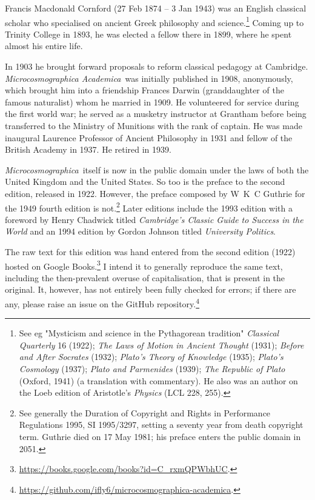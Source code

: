 \documentclass[12pt, oneside, b5paper]{memoir}
\newcommand{\ma}{\textit{Microcosmographica Academica}\ }
\newcommand{\mashort}{\textit{Microcosmographica}\ }
\begin{document}
Francis Macdonald Cornford (27 Feb 1874 -- 3 Jan 1943) was an English classical scholar who specialised on ancient Greek philosophy and science.\footnote{See eg "Mysticism and science in the Pythagorean tradition" \emph{Classical Quarterly} 16 (1922); \emph{The Laws of Motion in Ancient Thought} (1931); \emph{Before and After Socrates} (1932); \emph{Plato's Theory of Knowledge} (1935); \emph{Plato's Cosmology} (1937); \emph{Plato and Parmenides} (1939); \emph{The Republic of Plato} (Oxford, 1941) (a translation with commentary). He also was an author on the Loeb edition of Aristotle's \emph{Physics} (LCL 228, 255).} Coming up to Trinity College in 1893, he was elected a fellow there in 1899, where he spent almost his entire life.

In 1903 he brought forward proposals to reform classical pedagogy at Cambridge. \ma was initially published in 1908, anonymously, which brought him into a friendship Frances Darwin (granddaughter of the famous naturalist) whom he married in 1909. He volunteered for service during the first world war; he served as a musketry instructor at Grantham before being transferred to the Ministry of Munitions with the rank of captain. He was made inaugural Laurence Professor of Ancient Philosophy in 1931 and fellow of the British Academy in 1937. He retired in 1939.

\mashort itself is now in the public domain under the laws of both the United Kingdom and the United States. So too is the preface to the second edition, released in 1922. However, the preface composed by W~K~C Guthrie for the 1949 fourth edition is not.\footnote{See generally the Duration of Copyright and Rights in Performance Regulations 1995, SI 1995/3297, setting a seventy year from death copyright term. Guthrie died on 17 May 1981; his preface enters the public domain in 2051.} Later editions include the 1993 edition with a foreword by Henry Chadwick titled \emph{Cambridge's Classic Guide to Success in the World} and an 1994 edition by Gordon Johnson titled \emph{University Politics}.

The raw text for this edition was hand entered from the second edition (1922) hosted on Google Books.\footnote{\url{https://books.google.com/books?id=C_rxmQPWbhUC}.} I intend it to generally reproduce the same text, including the then-prevalent overuse of capitalisation, that is present in the original. It, however, has not entirely been fully checked for errors; if there are any, please raise an issue on the GitHub repository.\footnote{\url{https://github.com/ifly6/microcosmographica-academica}.}
\end{document}
